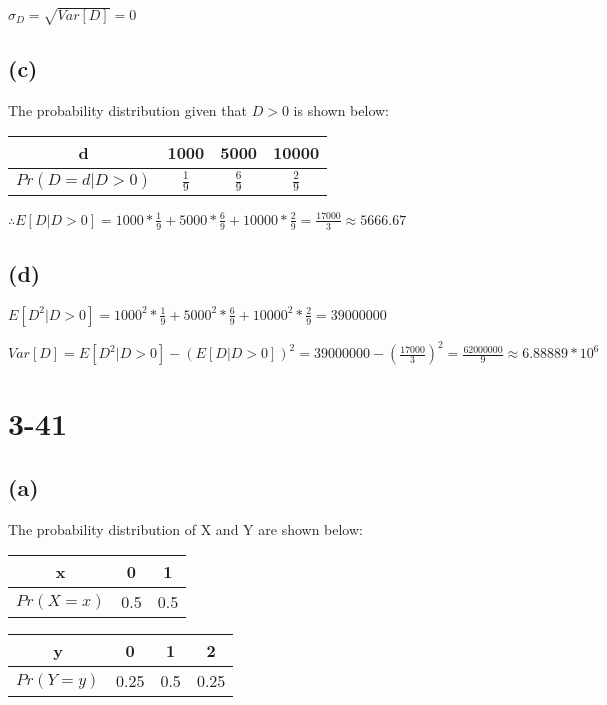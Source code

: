 \documentclass[12pt]{article}
\begin{document}
\begin{spacing}{2.0}
$\sigma_D=\sqrt{Var[D]}=0$

\subsection*{(c)}

The probability distribution given that $D>0$ is shown below:

\begin{tabular}{|c|c|c|c|}
  \hline
  d & 1000 & 5000 & 10000 \\
  \hline
  $Pr(D=d|D>0)$ & $\frac{1}{9}$ & $\frac{6}{9}$ & $\frac{2}{9}$ \\
  \hline
\end{tabular}

$\therefore E[D|D>0]= 1000*\frac{1}{9} +5000*\frac{6}{9} +10000*\frac{2}{9}=\frac{17000}{3} \approx 5666.67$

\subsection*{(d)}

$E[D^2|D>0]= 1000^2*\frac{1}{9} +5000^2*\frac{6}{9} +10000^2*\frac{2}{9}=39000000$

$Var[D]= E[D^2|D>0]- (E[D|D>0])^2= 39000000-\left( \frac{17000}{3} \right)^2= \frac{62000000}{9} \approx 6.88889*10^6$

\section*{3-41}

\subsection*{(a)}

The probability distribution of X and Y are shown below:

\begin{tabular}{|c|c|c|}
  \hline
  x & 0 & 1 \\
  \hline
  $Pr(X=x)$ & 0.5 & 0.5 \\
  \hline
\end{tabular}

\begin{tabular}{|c|c|c|c|}
  \hline
  y & 0 & 1 & 2 \\
  \hline
  $Pr(Y=y)$ & 0.25 & 0.5 & 0.25 \\
  \hline
\end{tabular}


\end{spacing}
\end{document}
